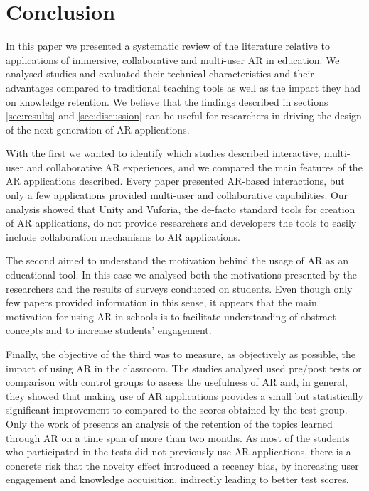 \section{Conclusion} \label{sec:conclusion}
In this paper we presented a systematic review of the literature relative to applications of immersive, collaborative and multi-user \gls{AR} in education. We analysed \papersSelected studies and evaluated their technical characteristics and their advantages compared to traditional teaching tools as well as the impact they had on knowledge retention. We believe that the findings described in sections \ref{sec:results} and \ref{sec:discussion} can be useful for researchers in driving the design of the next generation of AR applications.

With the first  we wanted to identify which studies described interactive, multi-user and collaborative AR experiences, and we compared the main features of the AR applications described. Every paper presented AR-based interactions, but only a few applications provided multi-user and collaborative capabilities. Our analysis showed that Unity and Vuforia, the de-facto standard tools for creation of \gls{AR} applications, do not provide researchers and developers the tools to easily include collaboration mechanisms to \gls{AR} applications.

The second  aimed to understand the motivation behind the usage of \gls{AR} as an educational tool. In this case we analysed both the motivations presented by the researchers and the results of surveys conducted on students. Even though only few papers provided information in this sense, it appears that the main motivation for using \gls{AR} in schools is to facilitate understanding of abstract concepts and to increase students' engagement.

Finally, the objective of the third  was to measure, as objectively as possible, the impact of using \gls{AR} in the classroom. The studies analysed used pre/post tests or comparison with control groups to assess the usefulness of \gls{AR} and, in general, they showed that making use of \gls{AR} applications provides a small but statistically significant improvement to compared to the scores obtained by the test group. Only the work of \citet{lin2016effect} presents an analysis of the retention of the topics learned through \gls{AR} on a time span of more than two months. As most of the students who participated in the tests did not previously use \gls{AR} applications, there is a concrete risk that the novelty effect introduced a recency bias, by increasing user engagement and knowledge acquisition, indirectly leading to better test scores.  

